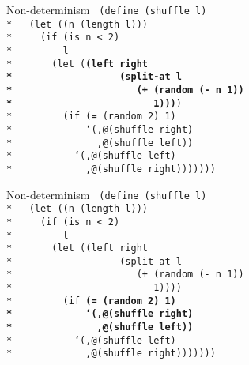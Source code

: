 \begin{frame}{Non-determinism}
  \texttt{
    (define (shuffle l)\\*
    \ \ (let ((n (length l)))\\*
    \ \ \ \ (if (is n < 2)\\*
    \ \ \ \ \ \ \ \ l\\*
    \ \ \ \ \ \ (let (\textbf{(left right\\*
    \ \ \ \ \ \ \ \ \ \ \ \ \ \ \ \ \ \ (split-at l\\*
    \ \ \ \ \ \ \ \ \ \ \ \ \ \ \ \ \ \ \ \ \ (+ (random (- n 1))\\*
    \ \ \ \ \ \ \ \ \ \ \ \ \ \ \ \ \ \ \ \ \ \ \ \ 1)))})\\*
    \ \ \ \ \ \ \ \ (if (= (random 2) 1)\\*
    \ \ \ \ \ \ \ \ \ \ \ \ `(,@(shuffle right)\\*
    \ \ \ \ \ \ \ \ \ \ \ \ \ \ ,@(shuffle left))\\*
    \ \ \ \ \ \ \ \ \ \ `(,@(shuffle left)\\*
    \ \ \ \ \ \ \ \ \ \ \ \ ,@(shuffle right)))))))
    }
\end{frame}


\begin{frame}{Non-determinism}
  \texttt{
    (define (shuffle l)\\*
    \ \ (let ((n (length l)))\\*
    \ \ \ \ (if (is n < 2)\\*
    \ \ \ \ \ \ \ \ l\\*
    \ \ \ \ \ \ (let ((left right\\*
    \ \ \ \ \ \ \ \ \ \ \ \ \ \ \ \ \ \ (split-at l\\*
    \ \ \ \ \ \ \ \ \ \ \ \ \ \ \ \ \ \ \ \ \ (+ (random (- n 1))\\*
    \ \ \ \ \ \ \ \ \ \ \ \ \ \ \ \ \ \ \ \ \ \ \ \ 1))))\\*
    \ \ \ \ \ \ \ \ (if \textbf{(= (random 2) 1)\\*
    \ \ \ \ \ \ \ \ \ \ \ \ `(,@(shuffle right)\\*
    \ \ \ \ \ \ \ \ \ \ \ \ \ \ ,@(shuffle left))}\\*
    \ \ \ \ \ \ \ \ \ \ `(,@(shuffle left)\\*
    \ \ \ \ \ \ \ \ \ \ \ \ ,@(shuffle right)))))))
    }
\end{frame}


